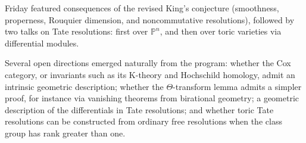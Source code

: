 \documentclass{amsart}
\newcommand{\PP}{\mathbb{P}}
\begin{document}
Friday featured consequences of the revised King's conjecture (smoothness, properness,
Rouquier dimension, and noncommutative resolutions), followed by two talks on Tate
resolutions: first over $\PP^n$, and then over toric varieties via differential modules.


Several open directions emerged naturally from the program: whether the Cox category, or
invariants such as its K-theory and Hochschild homology, admit an intrinsic geometric
description; whether the $\Theta$-transform lemma admits a simpler proof, for instance
via vanishing theorems from birational geometry; a geometric description of the
differentials in Tate resolutions; and whether toric Tate resolutions can be constructed
from ordinary free resolutions when the class group has rank greater than one.

\newpage


\end{document}
